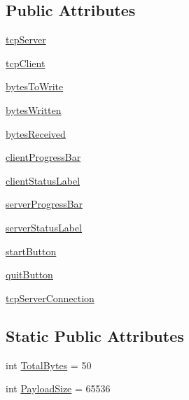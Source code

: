 \subsection*{Public Attributes}
\begin{DoxyCompactItemize}
\item 
\hyperlink{classloopback_1_1Dialog_a8ce655067cb8ace8a78bfe80031ac513}{tcp\+Server}
\item 
\hyperlink{classloopback_1_1Dialog_ae69896d6bfbd0588364a07b61dc6e714}{tcp\+Client}
\item 
\hyperlink{classloopback_1_1Dialog_a033353f01429bba48df3bb85a3148a3c}{bytes\+To\+Write}
\item 
\hyperlink{classloopback_1_1Dialog_ab22a113edadcae9ed5a7e481a2f6c0de}{bytes\+Written}
\item 
\hyperlink{classloopback_1_1Dialog_a83a7a1e526451996fd2e7c10ec151f2b}{bytes\+Received}
\item 
\hyperlink{classloopback_1_1Dialog_ac64f783b766b376cb0ae3f98963aecc7}{client\+Progress\+Bar}
\item 
\hyperlink{classloopback_1_1Dialog_afd3f5af7fcdc743b4b489b63fa02a762}{client\+Status\+Label}
\item 
\hyperlink{classloopback_1_1Dialog_a7e7676fc0016a1e018a9a9b93ddc03c6}{server\+Progress\+Bar}
\item 
\hyperlink{classloopback_1_1Dialog_aefad76eb6c2e1e1dbfe6849c6f315f7d}{server\+Status\+Label}
\item 
\hyperlink{classloopback_1_1Dialog_a078e8f38d3d954ee8c1f01f10be0a79e}{start\+Button}
\item 
\hyperlink{classloopback_1_1Dialog_a1b27dcaedb56226edf2aa017ccbbbad5}{quit\+Button}
\item 
\hyperlink{classloopback_1_1Dialog_ab3a80320fb28eecfe21c55fa96d7b2d2}{tcp\+Server\+Connection}
\end{DoxyCompactItemize}
\subsection*{Static Public Attributes}
\begin{DoxyCompactItemize}
\item 
int \hyperlink{classloopback_1_1Dialog_a7fd97d763a95a30183d64716c072aeb8}{Total\+Bytes} = 50
\item 
int \hyperlink{classloopback_1_1Dialog_a01a0d7c2faea79110218206d63ab8301}{Payload\+Size} = 65536
\end{DoxyCompactItemize}


